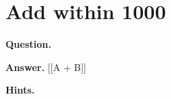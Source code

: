 \documentclass{article}
\begin{document}
\section*{Add within 1000}
\textbf{Question.} 

\textbf{Answer.} [[A + B]]

\textbf{Hints.}
\begin{itemize}

\end{itemize}
\end{document}

